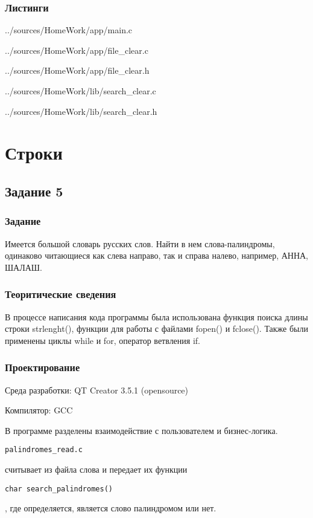 \documentclass[12pt,a4paper]{report}
\begin{document}
\subsection*{Листинги}

{../sources/HomeWork/app/main.c}


{../sources/HomeWork/app/file_clear.c}


{../sources/HomeWork/app/file_clear.h}


{../sources/HomeWork/lib/search_clear.c}


{../sources/HomeWork/lib/search_clear.h}


\chapter{Строки}
\section{Задание 5}
\subsection{Задание}
Имеется большой словарь русских слов. Найти в нем слова-палиндромы, одинаково читающиеся как слева направо, так и справа налево, например, АННА, ШАЛАШ.

\subsection{Теоритические сведения}
В процессе написания кода программы была использована функция поиска длины строки strlenght(), функции для работы с файлами fopen() и fclose(). Также были применены циклы while и for, оператор ветвления if. 
  
\subsection{Проектирование}
Среда разработки: QT Creator 3.5.1 (opensource)

Компилятор: GCC

В программе разделены взаимодействие с пользователем и бизнес-логика. \begin{verbatim}palindromes_read.c \end{verbatim} считывает из файла слова и передает их функции \begin{verbatim}char search_palindromes() \end{verbatim}, где определяется, является слово палиндромом или нет. 
\end{document}

